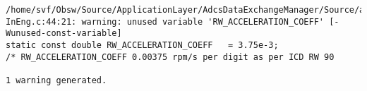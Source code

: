 
\noindent\begin{minipage}{\textwidth}
\begin{lstlisting}[language={}, caption=5th warning example., label=srciror_5]
/home/svf/Obsw/Source/ApplicationLayer/AdcsDataExchangeManager/Source/adem_GetReactionwheelMeas InEng.c:44:21: warning: unused variable 'RW_ACCELERATION_COEFF' [-Wunused-const-variable]
static const double RW_ACCELERATION_COEFF 	= 3.75e-3;
/* RW_ACCELERATION_COEFF 0.00375 rpm/s per digit as per ICD RW 90

1 warning generated.
\end{lstlisting}
\end{minipage}